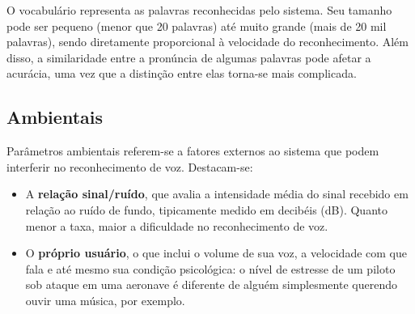 O vocabulário representa as palavras reconhecidas pelo sistema. Seu tamanho pode ser pequeno (menor que 20 palavras) até muito grande (mais de 20 mil palavras), sendo diretamente proporcional à velocidade do reconhecimento. Além disso, a similaridade entre a pronúncia de algumas palavras pode afetar a acurácia, uma vez que a distinção entre elas torna-se mais complicada.


\subsection{Ambientais}

Parâmetros ambientais referem-se a fatores externos ao sistema que podem interferir no reconhecimento de voz. Destacam-se:

\begin{itemize}
\item A \textbf{relação sinal/ruído}, que avalia a intensidade média do sinal recebido em relação ao ruído de fundo, tipicamente medido em decibéis (dB). Quanto menor a taxa, maior a dificuldade no reconhecimento de voz.

\item O \textbf{próprio usuário}, o que inclui o volume de sua voz, a velocidade com que fala e até mesmo sua condição psicológica: o nível de estresse de um piloto sob ataque em uma aeronave é diferente de alguém simplesmente querendo ouvir uma música, por exemplo.
\end{itemize}
